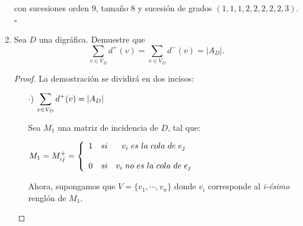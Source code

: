 \documentclass{article}
\begin{document}
\begin{enumerate}
  \begin{figure}[ht!]
    \centering
  \end{figure}
  
  con sucesiones orden $9$, tamaño $8$ y sucesión de grados $(1,1,1,2,2,2,2,2,3)$.
  \hfill $\square$
\item Sea $D$ una digr\'afica.   Demuestre que
  $$\sum_{v \in V_D} d^+(v) = \sum_{v \in V_D} d^-(v) = |A_D|.$$
  
  \renewcommand\qedsymbol{QED}
  \begin{proof}
    La demostración se dividirá en dos incisos:  
    \begin{itemize}
    \item[$\cdot$)] $\displaystyle \sum_{v \in V_{D}} d^{+}(v) = \abs{A_{D}}$ 
      
      Sea $M_{1}$ una matriz de incidencia de $D$, tal que:
      \begin{center}
        $M_{1} = M^{+}_{ij}
        = \left \{ 
        \begin{array}{lcc}
          1 &   si  & v_{i} \hspace{0.3em} es \hspace{0.3em} la
          \hspace{0.3em} cola \hspace{0.3em} de \hspace{0.3em} e_{j} \\
          \\0 &  si & v_{i} \hspace{0.3em} no \hspace{0.3em} es \hspace{0.3em}
          la \hspace{0.3em} cola \hspace{0.3em} de \hspace{0.3em} e_{j}
        \end{array}
        \right.$
      \end{center}
      Ahora, supongamos que $V = \{v_{1}, \dotsm, v_{n}\}$ donde $v_{i}$
      corresponde al \textit{i-ésimo} renglón de $M_{1}$.
      

\end{itemize}
\end{proof}
\end{enumerate}
\end{document}
